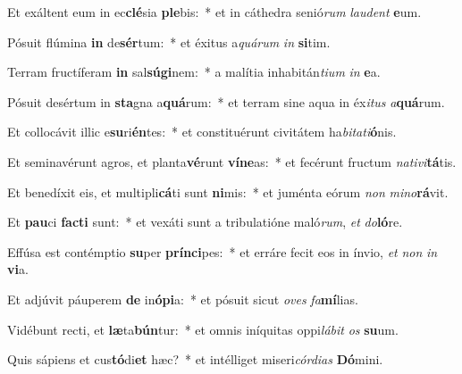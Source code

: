 \item Et exáltent eum in ec\textbf{clé}sia \textbf{ple}bis:~* et in cáthedra senió\textit{rum} \textit{lau}\textit{dent} \textbf{e}um.
\item Pósuit flúmina \textbf{in} de\textbf{sér}tum:~* et éxitus a\textit{quá}\textit{rum} \textit{in} \textbf{si}tim.
\item Terram fructíferam \textbf{in} sal\textbf{sú}\textbf{gi}nem:~* a malítia inhabitán\textit{ti}\textit{um} \textit{in} \textbf{e}a.
\item Pósuit desértum in \textbf{sta}gna a\textbf{quá}rum:~* et terram sine aqua in éx\textit{i}\textit{tus} \textit{a}\textbf{quá}rum.
\item Et collocávit illic e\textbf{su}ri\textbf{én}tes:~* et constituérunt civitátem ha\textit{bi}\textit{ta}\textit{ti}\textbf{ó}nis.
\item Et seminavérunt agros, et planta\textbf{vé}runt \textbf{ví}\textbf{ne}as:~* et fecérunt fructum \textit{na}\textit{ti}\textit{vi}\textbf{tá}tis.
\item Et benedíxit eis, et multipli\textbf{cá}ti sunt \textbf{ni}mis:~* et juménta eórum \textit{non} \textit{mi}\textit{no}\textbf{rá}vit.
\item Et \textbf{pau}ci \textbf{fac}\textbf{ti} sunt:~* et vexáti sunt a tribulatióne maló\textit{rum}, \textit{et} \textit{do}\textbf{ló}re.
\item Effúsa est contémptio \textbf{su}per \textbf{prín}\textbf{ci}pes:~* et erráre fecit eos in ínvio, \textit{et} \textit{non} \textit{in} \textbf{vi}a.
\item Et adjúvit páuperem \textbf{de} in\textbf{ó}\textbf{pi}a:~* et pósuit sicut \textit{o}\textit{ves} \textit{fa}\textbf{mí}lias.
\item Vidébunt recti, et \textbf{læ}ta\textbf{bún}tur:~* et omnis iníquitas oppi\textit{lá}\textit{bit} \textit{os} \textbf{su}um.
\item Quis sápiens et cus\textbf{tó}di\textbf{et} hæc?~* et intélliget miseri\textit{cór}\textit{di}\textit{as} \textbf{Dó}mini.
